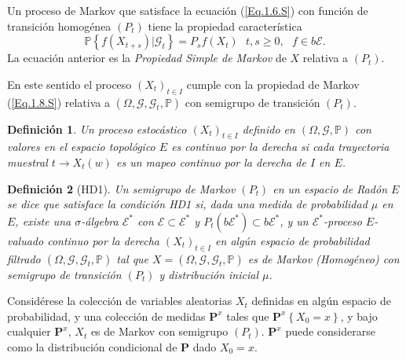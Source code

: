 \documentclass{article}
\newtheorem{Def}{Definición}
\newcommand{\prob}{\mathbb{P}}
\newcommand{\PE}{\left(X_{t}\right)_{t\in I}}
\begin{document}
Un proceso de Markov que satisface la ecuaci\'on (\ref{Eq.1.6.S}) con funci\'on de transici\'on homog\'enea $\left(P_{t}\right)$ tiene la propiedad caracter\'istica
\begin{equation}\label{Eq.1.8.S}
\prob\left\{f\left(X_{t+s}\right)|\mathcal{G}_{t}\right\}=P_{s}f\left(X_{t}\right)\textrm{ }t,s\geq0,\textrm{ }f\in b\mathcal{E}.
\end{equation}
La ecuaci\'on anterior es la {\em Propiedad Simple de Markov} de $X$ relativa a $\left(P_{t}\right)$.

En este sentido el proceso $\PE$ cumple con la propiedad de Markov (\ref{Eq.1.8.S}) relativa a $\left(\Omega,\mathcal{G},\mathcal{G}_{t},\prob\right)$ con semigrupo de transici\'on $\left(P_{t}\right)$.
\begin{Def}
Un proceso estoc\'astico $\PE$ definido en
$\left(\Omega,\mathcal{G},\prob\right)$ con valores en el espacio
topol\'ogico $E$ es continuo por la derecha si cada trayectoria
muestral $t\rightarrow X_{t}\left(w\right)$ es un mapeo continuo
por la derecha de $I$ en $E$.
\end{Def}

\begin{Def}[HD1]\label{Eq.2.1.S}
Un semigrupo de Markov $\left(P_{t}\right)$ en un espacio de
Rad\'on $E$ se dice que satisface la condici\'on {\em HD1} si,
dada una medida de probabilidad $\mu$ en $E$, existe una
$\sigma$-\'algebra $\mathcal{E^{*}}$ con
$\mathcal{E}\subset\mathcal{E}^{*}$ y
$P_{t}\left(b\mathcal{E}^{*}\right)\subset b\mathcal{E}^{*}$, y un
$\mathcal{E}^{*}$-proceso $E$-valuado continuo por la derecha
$\PE$ en alg\'un espacio de probabilidad filtrado
$\left(\Omega,\mathcal{G},\mathcal{G}_{t},\prob\right)$ tal que
$X=\left(\Omega,\mathcal{G},\mathcal{G}_{t},\prob\right)$ es de
Markov (Homog\'eneo) con semigrupo de transici\'on $(P_{t})$ y
distribuci\'on inicial $\mu$.
\end{Def}

Consid\'erese la colecci\'on de variables aleatorias $X_{t}$
definidas en alg\'un espacio de probabilidad, y una colecci\'on de
medidas $\mathbf{P}^{x}$ tales que
$\mathbf{P}^{x}\left\{X_{0}=x\right\}$, y bajo cualquier
$\mathbf{P}^{x}$, $X_{t}$ es de Markov con semigrupo
$\left(P_{t}\right)$. $\mathbf{P}^{x}$ puede considerarse como la
distribuci\'on condicional de $\mathbf{P}$ dado $X_{0}=x$.
\end{document}
